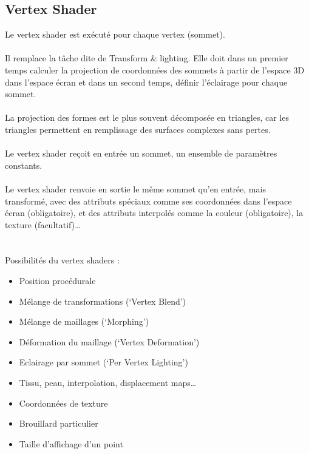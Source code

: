 \subsection{Vertex Shader}
Le vertex shader est exécuté pour chaque vertex (sommet).
\\\\
Il remplace la tâche dite de Transform \& lighting. Elle doit dans un premier temps calculer la projection de coordonnées des sommets à partir de l'espace 3D dans l'espace écran et dans un second temps, définir l’éclairage pour chaque sommet.
\\\\
La projection des formes est le plus souvent décomposée en triangles, car les triangles permettent en remplissage des surfaces complexes sans pertes.
\\\\
Le vertex shader reçoit en entrée un sommet, un ensemble  de paramètres constants.
\\\\
Le vertex shader renvoie en sortie le même sommet qu’en entrée, mais transformé, avec des attributs spéciaux comme ses coordonnées dans l’espace écran (obligatoire), et des attributs interpolés comme la couleur (obligatoire), la texture (facultatif)…
\\\\\\
Possibilités du vertex shaders :
\begin{itemize}
  \item Position procédurale
  \item Mélange de transformations (‘Vertex Blend’)
  \item Mélange de maillages (‘Morphing’) 
  \item Déformation du maillage (‘Vertex Deformation’)
  \item Eclairage par sommet (‘Per Vertex Lighting’)
  \item Tissu, peau, interpolation, displacement maps…
  \item Coordonnées de texture
  \item Brouillard particulier
  \item Taille d’affichage d’un point
  
\end{itemize} 

